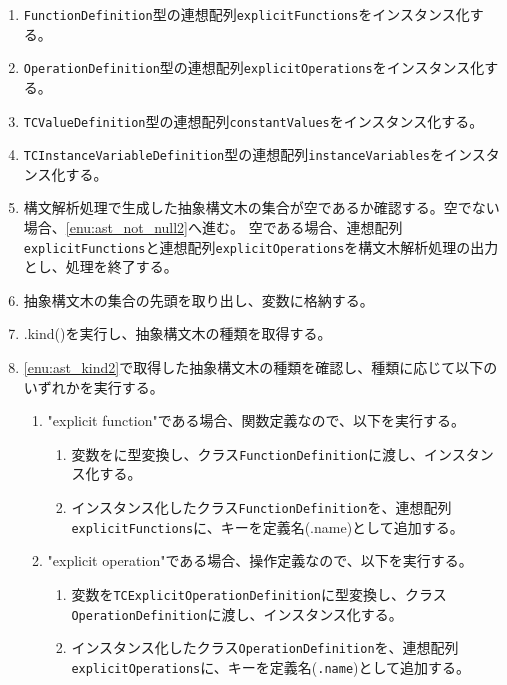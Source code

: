 \documentclass[uplatex, report, a4j, 10pt]{jsbook}
\newcommand\ttt[1]{\texttt{#1}}
\begin{document}
\begin{enumerate}
  \item \ttt{FunctionDefinition}型の連想配列\ttt{explicitFunctions}をインスタンス化する。
  \item \ttt{OperationDefinition}型の連想配列\ttt{explicitOperations}をインスタンス化する。
  \item \ttt{TCValueDefinition}型の連想配列\ttt{constantValues}をインスタンス化する。
  \item \ttt{TCInstanceVariableDefinition}型の連想配列\ttt{instanceVariables}をインスタンス化する。
  \item\label{enu:checkAstIsNull2} 構文解析処理で生成した抽象構文木の集合が空であるか確認する。空でない場合、\ref{enu:ast_not_null2}へ進む。
        空である場合、連想配列\ttt{explicitFunctions}と連想配列\ttt{explicitOperations}を構文木解析処理の出力とし、処理を終了する。
  \item\label{enu:ast_not_null2} 抽象構文木の集合の先頭を取り出し、変数\astDefinition{}に格納する。
  \item\label{enu:ast_kind2} \astDefinition{}.kind()を実行し、抽象構文木の種類を取得する。
  \item \ref{enu:ast_kind2}で取得した抽象構文木の種類を確認し、種類に応じて以下のいずれかを実行する。
        \begin{enumerate}
          \item "explicit function"である場合、関数定義なので、以下を実行する。
                \begin{enumerate}
                  \item 変数\astDefinition{}を\TCExplicitFunctionDefinition{}に型変換し、クラス\ttt{FunctionDefinition}に渡し、インスタンス化する。
                  \item インスタンス化したクラス\ttt{FunctionDefinition}を、連想配列\ttt{explicitFunctions}に、キーを定義名(\astDefinition{}.name)として追加する。
                \end{enumerate}
          \item "explicit operation"である場合、操作定義なので、以下を実行する。
                \begin{enumerate}
                  \item 変数\astDefinition{}を\ttt{TCExplicitOperationDefinition}に型変換し、クラス\ttt{OperationDefinition}に渡し、インスタンス化する。
                  \item インスタンス化したクラス\ttt{OperationDefinition}を、連想配列\ttt{explicitOperations}に、キーを定義名(\astDefinition{}\ttt{.name})として追加する。

\end{enumerate}
\end{enumerate}
\end{enumerate}
\end{document}

